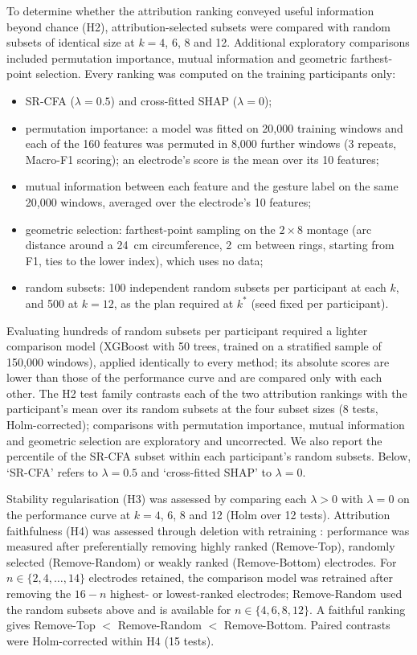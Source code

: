 To determine whether the attribution ranking conveyed useful information beyond chance (H2), attribution-selected subsets were compared with random subsets of identical size at $k = 4$, 6, 8 and 12. Additional exploratory comparisons included permutation importance, mutual information and geometric farthest-point selection. Every ranking was computed on the training participants only:
\begin{itemize}
\item SR-CFA ($\lambda = 0.5$) and cross-fitted SHAP ($\lambda = 0$);
\item permutation importance: a model was fitted on 20,000 training windows and each of the 160 features was permuted in 8,000 further windows (3 repeats, Macro-F1 scoring); an electrode's score is the mean over its 10 features;
\item mutual information between each feature and the gesture label on the same 20,000 windows, averaged over the electrode's 10 features;
\item geometric selection: farthest-point sampling on the $2 \times 8$ montage (arc distance around a 24~cm circumference, 2~cm between rings, starting from F1, ties to the lower index), which uses no data;
\item random subsets: 100 independent random subsets per participant at each $k$, and 500 at $k = 12$, as the plan required at $k^*$ (seed fixed per participant).
\end{itemize}
Evaluating hundreds of random subsets per participant required a lighter comparison model (XGBoost with 50 trees, trained on a stratified sample of 150,000 windows), applied identically to every method; its absolute scores are lower than those of the performance curve and are compared only with each other. The H2 test family contrasts each of the two attribution rankings with the participant's mean over its random subsets at the four subset sizes (8 tests, Holm-corrected); comparisons with permutation importance, mutual information and geometric selection are exploratory and uncorrected. We also report the percentile of the SR-CFA subset within each participant's random subsets. Below, `SR-CFA' refers to $\lambda = 0.5$ and `cross-fitted SHAP' to $\lambda = 0$.

Stability regularisation (H3) was assessed by comparing each $\lambda > 0$ with $\lambda = 0$ on the performance curve at $k = 4$, 6, 8 and 12 (Holm over 12 tests). Attribution faithfulness (H4) was assessed through deletion with retraining \citep{samek2017evaluating,hooker2019benchmark}: performance was measured after preferentially removing highly ranked (Remove-Top), randomly selected (Remove-Random) or weakly ranked (Remove-Bottom) electrodes. For $n \in \{2, 4, \ldots, 14\}$ electrodes retained, the comparison model was retrained after removing the $16 - n$ highest- or lowest-ranked electrodes; Remove-Random used the random subsets above and is available for $n \in \{4, 6, 8, 12\}$. A faithful ranking gives Remove-Top $<$ Remove-Random $<$ Remove-Bottom. Paired contrasts were Holm-corrected within H4 (15 tests).

